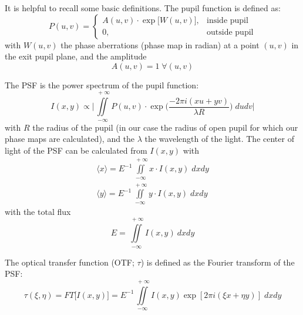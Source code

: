 
It is helpful to recall some basic definitions. The pupil function is defined as:
\begin{equation}
P(u,v) = \left\{\begin{array}{cl} A(u,v) \cdot \exp\big[W(u,v)\big], & \mbox{inside pupil}\\ 
0, & \mbox{outside pupil} \end{array}\right.
\end{equation}
with $W(u,v)$ the phase aberrations (phase map in radian) at a point $(u,v)$ in the exit pupil plane, and the amplitude
\begin{equation}\label{amp}
A(u,v) = 1 \; \forall (u,v)
\end{equation}

The PSF is the power spectrum of the pupil function:
\begin{equation}
I(x,y) \propto \Big \lvert \iint\limits_{-\infty}^{\: +\infty} P(u,v) \cdot \exp\Big(\frac{-2\pi i (xu+yv)}{\lambda R}\Big)\; dudv \Big \rvert
\end{equation}
with $R$ the radius of the pupil (in our case the radius of open pupil for which our phase maps are calculated), and the $\lambda$ the wavelength of the light. The center of light of the PSF can be calculated from $I(x,y)$ with
\begin{eqnarray}
\langle x \rangle = E^{-1} \iint\limits_{-\infty}^{\: +\infty} x \cdot I(x,y) \; dxdy \label{cl1}\\
\langle y \rangle = E^{-1} \iint\limits_{-\infty}^{\: +\infty} y \cdot I(x,y) \; dxdy \label{cl2}
\end{eqnarray}
with the total flux
\begin{equation}
E = \iint\limits_{-\infty}^{\; +\infty} I(x,y) \: dxdy
\end{equation}

The optical transfer function (OTF; $\tau$) is defined as the Fourier transform of the PSF:
\begin{equation}\label{ft}
\tau(\xi,\eta) = FT\big[I(x,y)\big] = E^{-1} \iint\limits_{-\infty}^{\: +\infty} I(x,y) \exp[2 \pi i (\xi x + \eta y)] \; dxdy
\end{equation}

